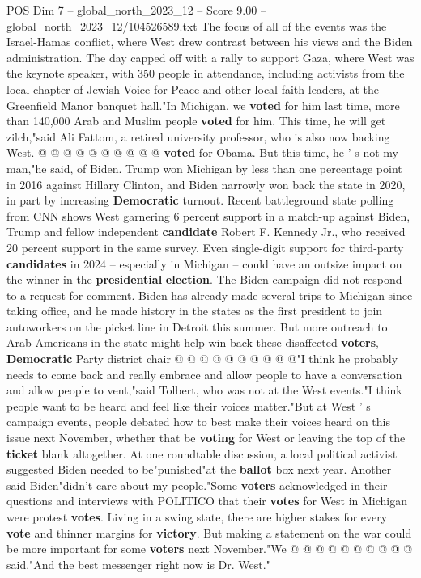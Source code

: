 \begin{textsample}{POS Dim 7 – global\_north\_2023\_12 – Score 9.00 – global\_north\_2023\_12/104526589.txt}
The focus of all of the events was the Israel-Hamas conflict, where West drew contrast between his views and the Biden administration.
The day capped off with a rally to support Gaza, where West was the keynote speaker, with 350 people in attendance, including activists from the local chapter of Jewish Voice for Peace and other local faith leaders, at the Greenfield Manor banquet hall."In Michigan, we \textbf{voted} for him last time, more than 140,000 Arab and Muslim people \textbf{voted} for him.
This time, he will get zilch,"said Ali Fattom, a retired university professor, who is also now backing West. @ @ @ @ @ @ @ @ @ @ \textbf{voted} for Obama.
But this time, he ' s not my man,"he said, of Biden.
Trump won Michigan by less than one percentage point in 2016 against Hillary Clinton, and Biden narrowly won back the state in 2020, in part by increasing \textbf{Democratic} turnout.
Recent battleground state polling from CNN shows West garnering 6 percent support in a match-up against Biden, Trump and fellow independent \textbf{candidate} Robert F.
Kennedy Jr., who received 20 percent support in the same survey.
Even single-digit support for third-party \textbf{candidates} in 2024 -- especially in Michigan -- could have an outsize impact on the winner in the \textbf{presidential} \textbf{election}.
The Biden campaign did not respond to a request for comment.
Biden has already made several trips to Michigan since taking office, and he made history in the states as the first president to join autoworkers on the picket line in Detroit this summer.
But more outreach to Arab Americans in the state might help win back these disaffected \textbf{voters}, \textbf{Democratic} Party district chair @ @ @ @ @ @ @ @ @ @"I think he probably needs to come back and really embrace and allow people to have a conversation and allow people to vent,"said Tolbert, who was not at the West events."I think people want to be heard and feel like their voices matter."But at West ' s campaign events, people debated how to best make their voices heard on this issue next November, whether that be \textbf{voting} for West or leaving the top of the \textbf{ticket} blank altogether.
At one roundtable discussion, a local political activist suggested Biden needed to be"punished"at the \textbf{ballot} box next year.
Another said Biden"didn't care about my people."Some \textbf{voters} acknowledged in their questions and interviews with POLITICO that their \textbf{votes} for West in Michigan were protest \textbf{votes}.
Living in a swing state, there are higher stakes for every \textbf{vote} and thinner margins for \textbf{victory}.
But making a statement on the war could be more important for some \textbf{voters} next November."We @ @ @ @ @ @ @ @ @ @ said."And the best messenger right now is Dr.
West."

\end{textsample}
